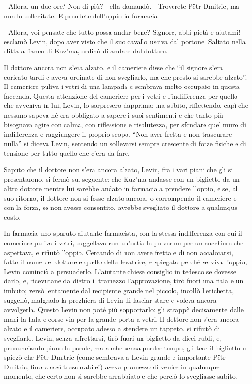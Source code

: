- Allora, un due ore? Non di più? - ella domandò. - Troverete Pëtr Dmitric, ma non lo sollecitate. E prendete dell'oppio in farmacia. 

- Allora, voi pensate che tutto possa andar bene? Signore, abbi pietà e aiutami! - esclamò Levin, dopo aver visto che il suo cavallo usciva dal portone. Saltato nella slitta a fianco di Kuz'ma, ordinò di andare dal dottore. 

Il dottore ancora non s'era alzato, e il cameriere disse che ``il signore s'era coricato tardi e aveva ordinato di non svegliarlo, ma che presto si sarebbe alzato''. Il cameriere puliva i vetri di una lampada e sembrava molto occupato in questa faccenda. Questa attenzione del cameriere per i vetri e l'indifferenza per quello che avveniva in lui, Levin, lo sorpresero dapprima; ma subito, riflettendo, capì che nessuno sapeva né era obbligato a sapere i suoi sentimenti e che tanto più bisognava agire con calma, con riflessione e risolutezza, per sfondare quel muro di indifferenza e raggiungere il proprio scopo. ``Non aver fretta e non trascurare nulla'' si diceva Levin, sentendo un sollevarsi sempre crescente di forze fisiche e di tensione per tutto quello che c'era da fare. 

Saputo che il dottore non s'era ancora alzato, Levin, fra i vari piani che gli si presentarono, si fermò sul seguente: che Kuz'ma andasse con un biglietto da un altro dottore mentre lui sarebbe andato in farmacia a prendere l'oppio, e se, al suo ritorno, il dottore non si fosse alzato ancora, o corrompendo il cameriere o con la forza, se non avesse consentito, avrebbe svegliato il dottore a qualunque costo. 

In farmacia uno sparuto aiutante farmacista, con la stessa indifferenza con cui il cameriere puliva i vetri, suggellava con un'ostia le polverine per un cocchiere che aspettava, e rifiutò l'oppio. Cercando di non avere fretta e di non accalorarsi, fatto il nome del dottore e quello della levatrice, e spiegato perché serviva l'oppio, Levin cominciò a persuaderlo. L'aiutante chiese consiglio in tedesco se dovesse darlo, e, ricevutane da dietro il tramezzo l'approvazione, tirò fuori una fiala e un imbuto; versò lentamente dal recipiente grande nel piccolo, incollò l'etichetta, suggellò, malgrado la preghiera di Levin di lasciar stare e voleva ancora avvolgerla. Questo Levin non poté più sopportarlo: gli strappò decisamente dalle mani la fiala e corse via per la grande porta a vetri. Il dottore non s'era ancora alzato e il cameriere, occupato adesso a stendere un tappeto, si rifiutò di svegliarlo. Levin, senza affrettarsi, tirò fuori un biglietto da dieci rubli, e, pronunciando piano le parole, ma anche senza perder tempo, gli tese il biglietto e spiegò che Pëtr Dmitric (come sembrava a Levin grande e importante Pëtr Dmitric, finora così trascurabile!) aveva promesso di venire in qualunque momento, che certo non si sarebbe arrabbiato e che perciò lo svegliasse subito. 

